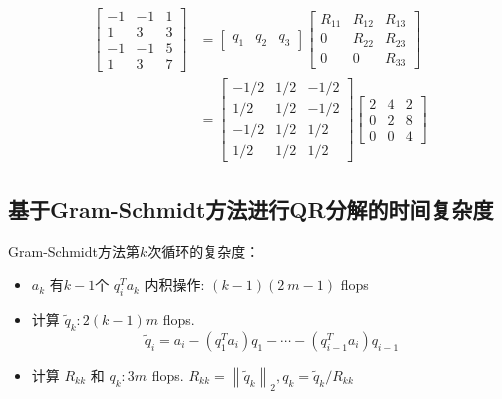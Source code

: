 \begin{example}
\begin{equation}
\begin{aligned}
\left[\begin{array}{rrr}
-1 & -1 & 1 \\
1 & 3 & 3 \\
-1 & -1 & 5 \\
1 & 3 & 7
\end{array}\right] &=\left[\begin{array}{lll}
q_{1} & q_{2} & q_{3}
\end{array}\right]\left[\begin{array}{ccc}
R_{11} & R_{12} & R_{13} \\
0 & R_{22} & R_{23} \\
0 & 0 & R_{33}
\end{array}\right] \\
&=\left[\begin{array}{rrr}
-1 / 2 & 1 / 2 & -1 / 2 \\
1 / 2 & 1 / 2 & -1 / 2 \\
-1 / 2 & 1 / 2 & 1 / 2 \\
1 / 2 & 1 / 2 & 1 / 2
\end{array}\right]\left[\begin{array}{rrr}
2 & 4 & 2 \\
0 & 2 & 8 \\
0 & 0 & 4
\end{array}\right]
\end{aligned}
\end{equation}
\end{example}

\subsection{基于Gram-Schmidt方法进行QR分解的时间复杂度}

Gram-Schmidt方法第$k$次循环的复杂度：

\begin{itemize}
    \item $ a_{k} $ 有$k-1$个 $ q_{i}^{T} a_{k} $ 内积操作: $ ( {k}-1)(2  {~m}-1) $ flops
    \item 计算 $ \tilde{q}_{k}: 2( {k}-1)  {m} $ flops. \begin{equation} \tilde{q}_{i}=a_{i}-\left(q_{1}^{T} a_{i}\right) q_{1}-\cdots-\left(q_{i-1}^{T} a_{i}\right) q_{i-1} \end{equation}
    \item 计算 $ R_{k k} $ 和 $ q_{k}: 3  {m} $ flops. $  R_{k k}=\left\|\tilde{q}_{k}\right\|_{2}, q_{k}=\tilde{q}_{k} / R_{k k} $
\end{itemize}

